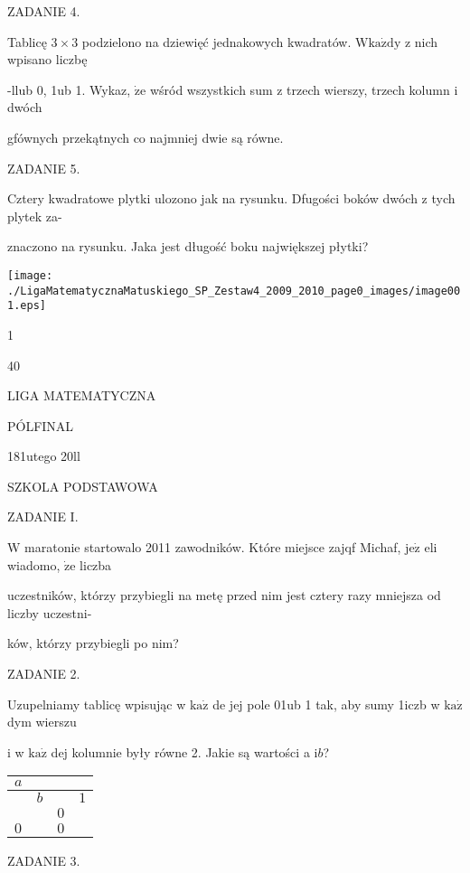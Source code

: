 \documentclass[a4paper,12pt]{article}
\begin{document}
ZADANIE 4.

Tablicę $3\times 3$ podzielono na dziewięć jednakowych kwadratów. $\mathrm{W}\mathrm{k}\mathrm{a}\dot{\mathrm{z}}\mathrm{d}\mathrm{y}$ z nich wpisano liczbę

-llub 0, 1ub 1. Wykaz, $\dot{\mathrm{z}}\mathrm{e}$ wśród wszystkich sum z trzech wierszy, trzech kolumn i dwóch

gfównych przekątnych co najmniej dwie są równe.

ZADANIE 5.

Cztery kwadratowe plytki ulozono jak na rysunku. Dfugości boków dwóch z tych plytek za-

znaczono na rysunku. Jaka jest długość boku największej płytki?
\begin{center}
\texttt{[image: ./LigaMatematycznaMatuskiego\_SP\_Zestaw4\_2009\_2010\_page0\_images/image001.eps]}
\end{center}
1

40






LIGA MATEMATYCZNA

PÓLFINAL

181utego 20ll

SZKOLA PODSTAWOWA

ZADANIE I.

$\mathrm{W}$ maratonie startowalo 2011 zawodników. Które miejsce zajqf Michaf, $\mathrm{j}\mathrm{e}\dot{\mathrm{z}}$ eli wiadomo, $\dot{\mathrm{z}}\mathrm{e}$ liczba

uczestników, którzy przybiegli na metę przed nim jest cztery razy mniejsza od liczby uczestni-

ków, którzy przybiegli po nim?

ZADANIE 2.

Uzupelniamy tablicę wpisując w $\mathrm{k}\mathrm{a}\dot{\mathrm{z}}$ de jej pole 01ub 1 tak, aby sumy 1iczb w $\mathrm{k}\mathrm{a}\dot{\mathrm{z}}$ dym wierszu

i w $\mathrm{k}\mathrm{a}\dot{\mathrm{z}}$ dej kolumnie były równe 2. Jakie są wartości a $\mathrm{i}b$?
\begin{center}
\begin{tabular}{|l|l|l|l|}
\hline
\multicolumn{1}{|l|}{$a$}&	\multicolumn{1}{|l|}{}&	\multicolumn{1}{|l|}{}&	\multicolumn{1}{|l|}{}	\\
\hline
\multicolumn{1}{|l|}{}&	\multicolumn{1}{|l|}{ $b$}&	\multicolumn{1}{|l|}{}&	\multicolumn{1}{|l|}{ $1$}	\\
\hline
\multicolumn{1}{|l|}{}&	\multicolumn{1}{|l|}{}&	\multicolumn{1}{|l|}{ $0$}&	\multicolumn{1}{|l|}{}	\\
\hline
\multicolumn{1}{|l|}{ $0$}&	\multicolumn{1}{|l|}{}&	\multicolumn{1}{|l|}{ $0$}&	\multicolumn{1}{|l|}{}	\\
\hline
\end{tabular}

\end{center}
ZADANIE 3.
\end{document}
